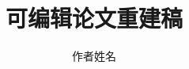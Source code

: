 \documentclass[UTF8,11pt,letterpaper]{ctexart}
\title{可编辑论文重建稿}
\author{作者姓名}
\date{}
\begin{document}
\maketitle
\reconstructionnotice



\clearpage

\end{document}
